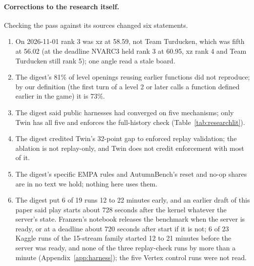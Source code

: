 \paragraph{Corrections to the research itself.}
Checking the pass against its sources changed six statements. %
\begin{enumerate}\setlength{\itemsep}{2pt}
\item On 2026-11-01 rank 3 was xz at 58.59, not Team Turducken, which was fifth at 56.02 (at the deadline NVARC3 held rank 3 at 60.95, xz rank 4 and Team Turducken still rank 5); one angle read a stale board. %
\item The digest's 81\% of level openings reusing earlier functions did not reproduce; by our definition (the first turn of a level 2 or later calls a function defined earlier in the game) it is 73\%. %
\item The digest said public harnesses had converged on five mechanisms; only Twin has all five and enforces the full-history check (Table~\ref{tab:researchlit}). %
\item The digest credited Twin's 32-point gap to enforced replay validation; the ablation is not replay-only, and Twin does not credit enforcement with most of it. %
\item The digest's specific EMPA rules \citep{tsividis2021empa} and AutumnBench's reset and no-op shares \citep{warrier2025autumnbench} are in no text we hold; nothing here uses them. %
\item The digest put 6 of 19 runs 12 to 22 minutes early, and an earlier draft of this paper said play starts about 728 seconds after the kernel whatever the server's state. Franzen's notebook releases the benchmark when the server is ready, or at a deadline about 720 seconds after start if it is not; 6 of 23 Kaggle runs of the 15-stream family started 12 to 21 minutes before the server was ready, and none of the three replay-check runs by more than a minute (Appendix~\ref{app:harness}); the five Vertex control runs were not read. %
\end{enumerate}
